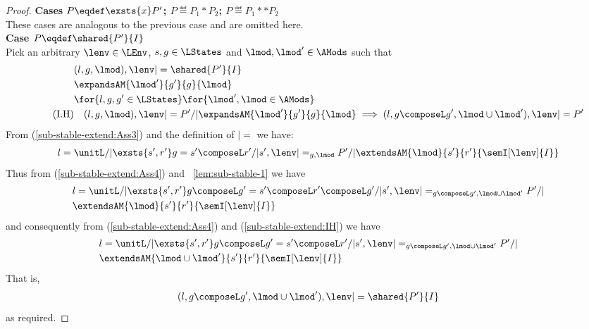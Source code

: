 \begin{lemma}[]
\begin{proof}
\noindent\textbf{Cases $P \eqdef \exsts{x} P'$; $P \eqdef P_1 * P_2$; $P \eqdef P_1 ** P_2$} \\
These cases are analogous to the previous case and are omitted here. \\

\noindent\textbf{Case $P \eqdef \shared{P'}{I}$} \\
Pick an arbitrary $\lenv \in \LEnv$, $s, g \in \LStates$ and $\lmod, \lmod' \in \AMods$ such that
%
\begin{align}
	&(l, g, \lmod), \lenv |= \shared{P'}{I} \label{sub-stable-extend:Ass3}\\
	& \expandsAM{\lmod'}{g'}{g}{\lmod} \label{sub-stable-extend:Ass4}\\
	& \for{l, g , g'\in \LStates} \for{\lmod', \lmod \in \AMods} \nonumber\\
	\tag{I.H} & 
	\quad (l, g, \lmod), \lenv |= P' /| \expandsAM{\lmod'}{g'}{g}{\lmod} \implies (l, g \composeL g', \lmod \cup \lmod'), \lenv |= P' \label{sub-stable-extend:IH}
\end{align}
%
From (\ref{sub-stable-extend:Ass3}) and the definition of $|=$ we have:
%
\begin{align*}
	l = \unitL /| \exsts{s', r'} g = s' \composeL r' /| s', \lenv |=_{g, \lmod} P' /| \extendsAM{\lmod}{s'}{r'}{\semI[\lenv]{I}} 
\end{align*}  
%
Thus from (\ref{sub-stable-extend:Ass4}) and \lem~\ref{lem:sub-stable-1} we have
%
\begin{align*}
	& l = \unitL /| \exsts{s', r'} g \composeL g' = s' \composeL r' \composeL g' /| s', \lenv |=_{g \composeL g', \lmod \cup \lmod'} P' /|\\
	& \extendsAM{\lmod}{s'}{r'}{\semI[\lenv]{I}}
\end{align*}
%
and consequently from (\ref{sub-stable-extend:Ass4}) and (\ref{sub-stable-extend:IH}) we have
%
\begin{align*}
	& l = \unitL /| \exsts{s', r'} g \composeL g' = s' \composeL r' /| s', \lenv |=_{g \composeL g', \lmod \cup \lmod'} P' /|\\
	& \extendsAM{\lmod \cup \lmod'}{s'}{r'}{\semI[\lenv]{I}}
\end{align*}
%
That is,
%
\begin{align}
	(l, g \composeL g', \lmod \cup \lmod'), \lenv |= \shared{P'}{I} \label{sub-stable-extend:Ass5}
\end{align}
%
as required.
\end{proof}
\end{lemma}
